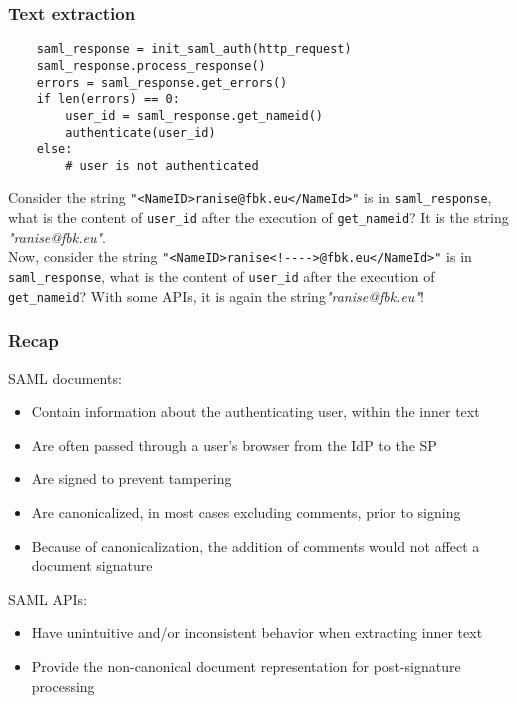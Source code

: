 \documentclass[a4paper, 10pt, titlepage]{article}
\begin{document}
\subsubsection*{Text extraction}
\begin{lstlisting}
	saml_response = init_saml_auth(http_request)
	saml_response.process_response()
	errors = saml_response.get_errors()
	if len(errors) == 0:
		user_id = saml_response.get_nameid()
		authenticate(user_id)
	else:
		# user is not authenticated
\end{lstlisting}
Consider the string \lstinline|"<NameID>ranise@fbk.eu</NameId>"| is in \lstinline|saml_response|, what is the content of \lstinline|user_id| after the execution of \lstinline|get_nameid|? It is the string \textit{"ranise@fbk.eu"}. \medskip\\
Now, consider the string \lstinline|"<NameID>ranise<!---->@fbk.eu</NameId>"| is in \lstinline|saml_response|, what is the content of \lstinline|user_id| after the execution of \lstinline|get_nameid|? With some APIs, it is again the string\textit{"ranise@fbk.eu"}! \medskip

\subsubsection{Recap}
SAML documents:
\begin{itemize}
\item Contain information about the authenticating user, within the inner text
\item Are often passed through a user’s browser from the IdP to the SP
\item Are signed to prevent tampering
\item Are canonicalized, in most cases excluding comments, prior to signing
\item Because of canonicalization, the addition of comments would not affect a document signature
\end{itemize}
SAML APIs:
\begin{itemize}
\item Have unintuitive and/or inconsistent behavior when extracting inner text
\item Provide the non-canonical document representation for post-signature processing
\end{itemize}
\end{document}
